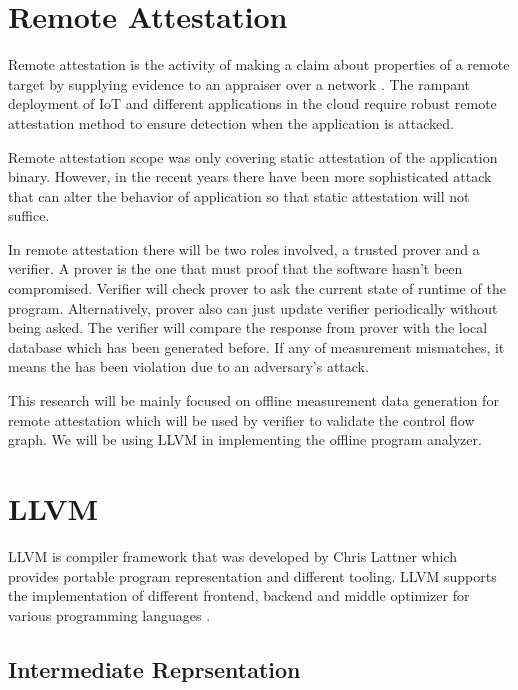 
\section{Remote Attestation}
Remote attestation is the activity of making a claim about properties of a remote target by supplying evidence to an appraiser over a network \cite{cokerPrinciplesRemoteAttestation2011a}. The rampant deployment of IoT and different applications in the cloud require robust remote attestation method to ensure detection when the application is attacked.

Remote attestation scope was only covering static attestation of the application binary. However, in the recent years there have been more sophisticated attack that can alter the behavior of application so that static attestation will not suffice. 

In remote attestation there will be two roles involved, a trusted prover and a verifier. A prover is the one that must proof that the software hasn't been compromised. Verifier will check prover to ask the current state of runtime of the program. Alternatively, prover also can just update verifier periodically without being asked. The verifier will compare the response from prover with the local database which has been generated before. If any of measurement mismatches, it means the has been violation due to an adversary's attack.

This research will be mainly focused on offline measurement data generation for remote attestation which will be used by verifier to validate the control flow graph. We will be using LLVM in implementing the offline program analyzer.

\section{LLVM}

LLVM is compiler framework that was developed by Chris Lattner which provides portable program representation and different tooling. LLVM supports the implementation of different frontend, backend and middle optimizer for various programming languages \cite{lattnerLLVMCompilationFramework2004a}. 

\subsection{Intermediate Reprsentation}

